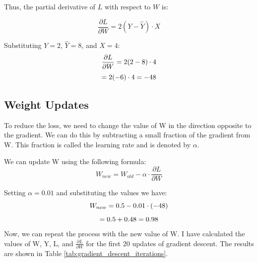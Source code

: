 \documentclass[12pt,a4paper]{article}
\begin{document}
Thus, the partial derivative of \( L \) with respect to \( W \) is:

\[
\frac{\partial L}{\partial W} = 2(Y - \hat{Y}) \cdot X
\]

Substituting \( Y = 2 \), \( \hat{Y} = 8 \), and \( X = 4 \):
\[
\frac{\partial L}{\partial W} = 2(2 - 8) \cdot 4 \\
\]
\[
= 2(-6) \cdot 4 \\ = -48 \\
\]

\subsection{Weight Updates}

To reduce the loss, we need to change the value of W in the direction opposite to the gradient. We can do this by subtracting a small fraction of the gradient from W. This fraction is called the learning rate and is denoted by \( \alpha \).

We can update W using the following formula:
\[
W_{new} = W_{old} - \alpha \cdot \frac{\partial L}{\partial W}
\]

Setting \( \alpha = 0.01 \) and substituting the values we have:
\[
W_{new} = 0.5 - 0.01 \cdot (-48) \\
\]
\[
= 0.5 + 0.48 \\ =  0.98 \\
\]
Now, we can repeat the process with the new value of W. I have calculated the values of W, Y, L, and \( \frac{\partial L}{\partial W} \) for the first 20 updates of gradient descent. The results are shown in Table \ref{tab:gradient_descent_iterations}.
\end{document}
